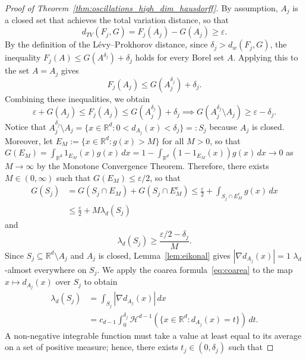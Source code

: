\documentclass[12pt]{article}
\newcommand{\RR}{\mathbb{R}}
\begin{document}
\begin{proof}[Proof of Theorem~\ref{thm:oscillations_high_dim_hausdorff}]
By assumption, $A_j$ is a closed set that achieves the total variation distance, so that
\begin{equation*}
d_{TV}(F_j, G) = F_j(A_j) - G(A_j) \geq \varepsilon.
\end{equation*}
By the definition of the L\'evy--Prokhorov distance, since $\delta_j > d_w(F_j, G)$, the
inequality $F_j(A) \leq G(A^{\delta_j}) + \delta_j$ holds for every Borel set $A$. 
Applying this to the set $A = A_j$ gives
%
\begin{equation*}
F_j(A_j) \leq G(A_j^{\delta_j}) + \delta_j.
\end{equation*}
Combining these inequalities, we obtain
\begin{equation*}
\varepsilon + G(A_j) \leq F_j(A_j) \leq G(A_j^{\delta_j}) + \delta_j \implies G(A_j^{\delta_j} \setminus A_j) \geq \varepsilon - \delta_j.
\end{equation*}
Notice that $A_j^{\delta_j} \setminus A_j = \{x \in \RR^d : 0 < d_{A_j}(x) < \delta_j\}=:S_j$
because $A_j$ is closed. Moreover, let $E_M:=\{x\in\RR^d : g(x)>M\}$ for all $M>0$, so that
$G(E_{M})=\int_{\RR^d}1_{E_M}(x) g(x)\,dx = 1 - \int_{\RR^d}(1-1_{E_M}(x)) g(x)\,dx\to 0$ as
$M\to\infty$ by the Monotone Convergence Theorem. Therefore, there exists $M\in(0,\infty)$ such
that $G(E_{M})\leq \varepsilon/2$, so that
%
\begin{align*}
    G(S_j)& = G(S_j\cap E_M) + G(S_j\cap E_M^c)\leq \frac{\varepsilon}{2} + \int_{S_j\cap E_{M}^c}g(x)\,dx \\
    &\leq \frac{\varepsilon}{2} +M\lambda_d(S_j)
\end{align*}
%
and
%
\begin{equation}\label{eq:shell_lower}
    \lambda_d(S_j) \geq \frac{\varepsilon/2 - \delta_j}{M}.
\end{equation}
%
Since $S_j \subseteq \RR^d \setminus A_j$ and $A_j$ is closed, Lemma~\ref{lem:eikonal} gives
$|\nabla d_{A_j}(x)| = 1$ $\lambda_d$-almost everywhere on $S_j$. We apply the coarea
formula~\eqref{eq:coarea} to the map $x \mapsto d_{A_j}(x)$ over $S_j$ to obtain
\begin{align*}
\lambda_d(S_j) & = \int_{S_j} |\nabla d_{A_j}(x)| \, dx \\
&= c_{d-1}\int_0^{\delta_j} \mathcal{H}^{d-1}(\{x \in \RR^d : d_{A_j}(x) = t\}) \, dt.
\end{align*}
A non-negative integrable function must take a value at least equal
to its average on a set of positive measure; hence, there exists $t_j \in (0, \delta_j)$ such that

\end{proof}
\end{document}
